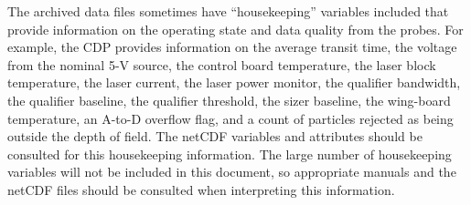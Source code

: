 The archived data files sometimes have ``housekeeping'' variables
included that provide information on the operating state and data
quality from the probes. For example, the CDP provides information
on the average transit time, the voltage from the nominal 5-V source,
the control board temperature, the laser block temperature, the laser
current, the laser power monitor, the qualifier bandwidth, the qualifier
baseline, the qualifier threshold, the sizer baseline, the wing-board
temperature, an A-to-D overflow flag, and a count of particles rejected
as being outside the depth of field. The netCDF variables and attributes
should be consulted for this housekeeping information. The large number
of housekeeping variables will not be included in this document, so
appropriate manuals and the netCDF files should be consulted when
interpreting this information.


